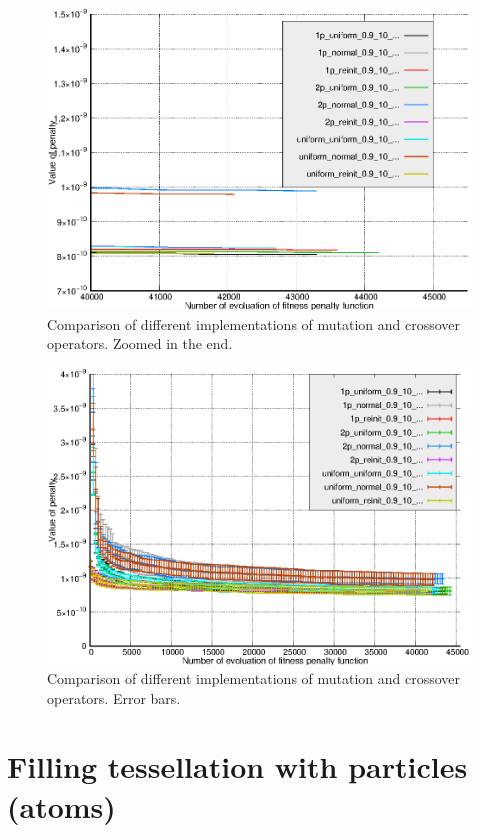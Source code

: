 \documentclass[12pt]{report}
\begin{document}
\begin{figure}
    \centering
    \includegraphics[width=5.0in]{operators_comparison_zoom_orient}
    \caption{Comparison of different implementations of mutation and crossover operators. Zoomed in the end.}
    \label{operatorcomparisonorientzoom}
\end{figure}

\begin{figure}
    \centering
    \includegraphics[width=5.0in]{operators_comparison_err_orient}
    \caption{Comparison of different implementations of mutation and crossover operators. Error bars.}
    \label{operatorcomparisonorienterr}
\end{figure}

\section{Filling tessellation with particles (atoms)}
\end{document}

